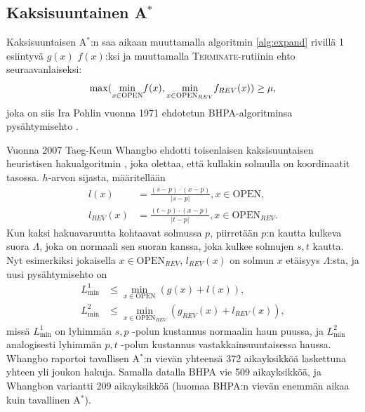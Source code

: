 \documentclass[finnish]{tktltiki2}
\theoremstyle{definition}
\theoremstyle{remark}
\begin{document}
\subsection{Kaksisuuntainen A$^{\ast}$}
Kaksisuuntaisen A$^{\ast}$:n saa aikaan muuttamalla algoritmin \ref{alg:expand} rivillä 1 esiintyvä $g(x)$ $f(x)$:ksi ja muuttamalla \textsc{Terminate}-rutiinin ehto seuraavanlaiseksi:
\[
\max( \underset{x \in \textsc{OPEN}}{\min} f(x), \underset{x \in \textsc{OPEN}_{REV}}{\min}f_{REV}(x) ) \geq \mu,
\]
joka on siis Ira Pohlin vuonna 1971 ehdotetun BHPA-algoritminsa pysähtymisehto \cite{Pohl71}.

Vuonna 2007 Taeg-Keun Whangbo ehdotti toisenlaisen kaksisuuntaisen heuristisen hakualgoritmin \cite{Whangbo07}, joka olettaa, että kullakin solmulla on koordinaatit tasossa. $h$-arvon sijasta, määritellään
\begin{align*}
l(x) &= \frac{(s - p) \cdot (x - p)}{ | s - p | }, x \in \text{OPEN}, \\
l_{REV}(x) &= \frac{(t - p) \cdot (x - p)}{ | t - p | }, x \in \text{OPEN}_{REV}.
\end{align*}
Kun kaksi hakuavaruutta kohtaavat solmussa $p$, piirretään $p$:n kautta kulkeva suora $\Lambda$, joka on normaali sen suoran kanssa, joka kulkee solmujen $s, t$ kautta. Nyt esimerkiksi jokaisella $x \in \text{OPEN}_{REV}$, $l_{REV}(x)$ on solmun $x$ etäisyys $\Lambda$:sta, ja uusi pysähtymisehto on
\begin{align*}
L^1_{\min} & \leq \underset{x \in \text{OPEN}}{\min} (g(x) + l(x)), \\
L^2_{\min} & \leq \underset{x \in \text{OPEN}_{REV}}{\min} (g_{REV}(x) + l_{REV}(x)),
\end{align*}
missä $L_{\min}^1$ on lyhimmän $s, p$ -polun kustannus normaalin haun puussa, ja $L_{\min}^2$ analogisesti lyhimmän $p, t$ -polun kustannus vastakkainsuuntaisessa haussa. Whangbo raportoi tavallisen A$^{\ast}$:n vievän yhteensä 372 aikayksikköä laskettuna yhteen yli joukon hakuja. Samalla datalla BHPA vie 509 aikayksikköä, ja Whangbon variantti 209 aikayksikköä (huomaa BHPA:n vievän enemmän aikaa kuin tavallinen A$^{\ast}$).
\end{document}
